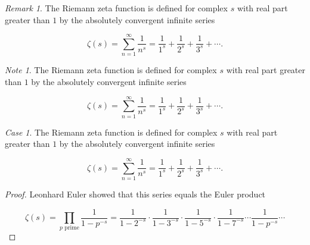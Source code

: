\documentclass[english,oneside, article]{memoir}
\theoremstyle{plain}
\theoremstyle{definition}
\theoremstyle{remark}
\newtheorem{Case}{Case}[chapter]
\newtheorem*{Remark}{Remark}
\newtheorem*{Note}{Note}
\begin{document}
\begin{Remark}

The Riemann zeta function is defined for complex \(s\) with real part
greater than \(1\) by the absolutely convergent infinite series

\[\zeta(s) = \sum_{n=1}^\infty \frac{1}{n^s} = \frac{1}{1^s} + \frac{1}{2^s} + \frac{1}{3^s} + \cdots.\]

\end{Remark}

\begin{Note}

The Riemann zeta function is defined for complex \(s\) with real part
greater than \(1\) by the absolutely convergent infinite series

\[\zeta(s) = \sum_{n=1}^\infty \frac{1}{n^s} = \frac{1}{1^s} + \frac{1}{2^s} + \frac{1}{3^s} + \cdots.\]

\end{Note}

\begin{Case}

The Riemann zeta function is defined for complex \(s\) with real part
greater than \(1\) by the absolutely convergent infinite series

\[\zeta(s) = \sum_{n=1}^\infty \frac{1}{n^s} = \frac{1}{1^s} + \frac{1}{2^s} + \frac{1}{3^s} + \cdots.\]

\end{Case}

\begin{proof}

Leonhard Euler showed that this series equals the Euler product

\[\zeta(s) = \prod_{p \text{ prime}} \frac{1}{1-p^{-s}}= \frac{1}{1-2^{-s}}\cdot\frac{1}{1-3^{-s}}\cdot\frac{1}{1-5^{-s}}\cdot\frac{1}{1-7^{-s}} \cdots \frac{1}{1-p^{-s}} \cdots\]

\end{proof}
\end{document}
